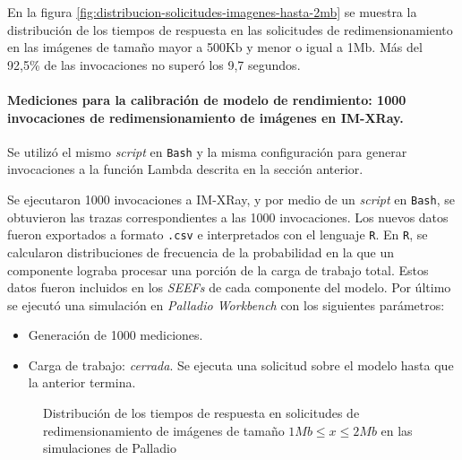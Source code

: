 En la figura \ref{fig:distribucion-solicitudes-imagenes-hasta-2mb} se muestra la distribución de los tiempos de respuesta en las solicitudes de redimensionamiento en las imágenes de tamaño mayor a 500Kb y menor o igual a 1Mb. Más del 92,5\% de las invocaciones no superó los 9,7 segundos.

\paragraph{Mediciones para la calibración de modelo de rendimiento: 1000 invocaciones de redimensionamiento de imágenes en IM-XRay.} Se utilizó el mismo \emph{script} en \texttt{Bash} y la misma configuración para generar invocaciones a la función Lambda descrita en la sección anterior.

Se ejecutaron 1000 invocaciones a IM-XRay, y por medio de un \emph{script} en \texttt{Bash}, se obtuvieron las trazas correspondientes a las 1000 invocaciones. Los nuevos datos fueron exportados a formato \texttt{.csv} e interpretados con el lenguaje \texttt{R}. En \texttt{R}, se calcularon distribuciones de frecuencia de la probabilidad en la que un componente lograba procesar una porción de la carga de trabajo total. Estos datos fueron incluidos en los \emph{SEEFs} de cada componente del modelo. Por último se ejecutó una simulación en \emph{Palladio Workbench} con los siguientes parámetros:
\begin{itemize}
    \item Generación de 1000 mediciones.
    \item Carga de trabajo: \emph{cerrada}. Se ejecuta una solicitud sobre el modelo hasta que la anterior termina. 
\end{itemize}

\begin{figure}
\hspace{-1cm}
\caption{Distribución de los tiempos de respuesta en solicitudes de redimensionamiento de imágenes de tamaño $1Mb \leq x \leq 2Mb$ en las simulaciones de Palladio}
\label{fig:distribucion-simulacion-imagenes-hasta-2mb}
\end{figure}

